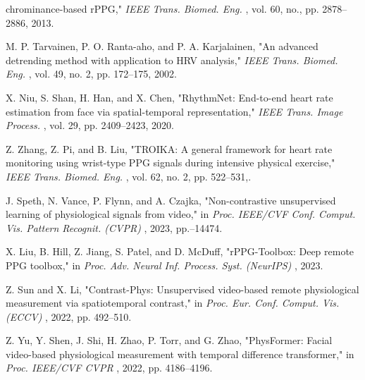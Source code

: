 \documentclass[twocolumn,letterpaper]{article}
\newcommand\lb{\linebreak[4]\relax}                         %
\begin{document}
{\begin{list}{}
chrominance-based rPPG," \textit{IEEE Trans. Biomed. Eng.} , vol. 60, no.\lb
10, pp. 2878--2886, 2013.
\item[{[10]}] M. P. Tarvainen, P. O. Ranta-aho, and P. A. Karjalainen, "An\lb
advanced detrending method with application to HRV analysis," \textit{IEEE\lb
Trans. Biomed. Eng.} , vol. 49, no. 2, pp. 172--175, 2002.
\item[{[11]}] X. Niu, S. Shan, H. Han, and X. Chen, "RhythmNet: End-to-end heart\lb
rate estimation from face via spatial-temporal representation," \textit{IEEE\lb
Trans. Image Process.} , vol. 29, pp. 2409--2423, 2020.
\item[{[12]}] Z. Zhang, Z. Pi, and B. Liu, "TROIKA: A general framework for heart\lb
rate monitoring using wrist-type PPG signals during intensive physical\lb
exercise," \textit{IEEE Trans. Biomed. Eng.} , vol. 62, no. 2, pp. 522--531,\lb
2015.
\item[{[13]}] J. Speth, N. Vance, P. Flynn, and A. Czajka, "Non-contrastive\lb
unsupervised learning of physiological signals from video," in \textit{Proc.\lb
IEEE/CVF Conf. Comput. Vis. Pattern Recognit. (CVPR)} , 2023, pp.\lb
14464--14474.
\item[{[14]}] X. Liu, B. Hill, Z. Jiang, S. Patel, and D. McDuff, "rPPG-Toolbox:\lb
Deep remote PPG toolbox," in \textit{Proc. Adv. Neural Inf. Process. Syst.\lb
(NeurIPS)} , 2023.
\item[{[15]}] Z. Sun and X. Li, "Contrast-Phys: Unsupervised video-based remote\lb
physiological measurement via spatiotemporal contrast," in \textit{Proc. Eur.\lb
Conf. Comput. Vis. (ECCV)} , 2022, pp. 492--510.
\item[{[16]}] Z. Yu, Y. Shen, J. Shi, H. Zhao, P. Torr, and G. Zhao, "PhysFormer:\lb
Facial video-based physiological measurement with temporal difference\lb
transformer," in \textit{Proc. IEEE/CVF CVPR} , 2022, pp. 4186--4196.
\end{list}
\par}
\end{document}

